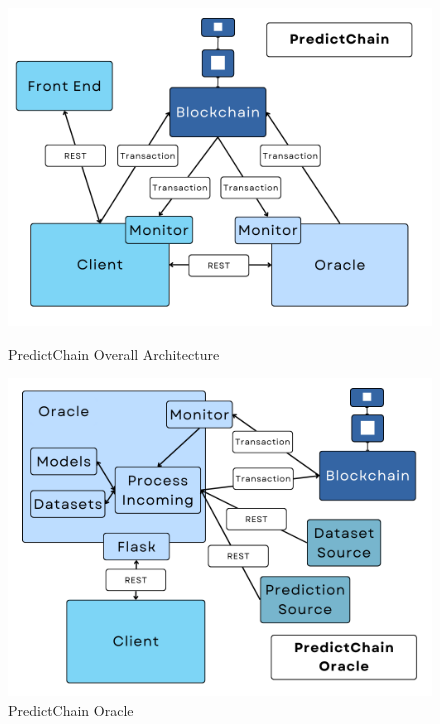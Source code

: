 \documentclass{ledger}
\begin{document}
\begin{figure}[!htbp]
\centering
\begin{minipage}{.5\textwidth}
  \centering
   \includegraphics[width=0.98\linewidth]{images/detailedDiagram}
   \caption{PredictChain Overall Architecture}
   \label{Fig:detailedDiagram}

\end{minipage}%
\begin{minipage}{.5\textwidth}
  \centering
  \includegraphics[width=0.98\linewidth]{images/oracleDiagram}
   \caption{PredictChain Oracle}
   \label{Fig:oracleDiagram}
\end{minipage}
\end{figure}
\end{document}
